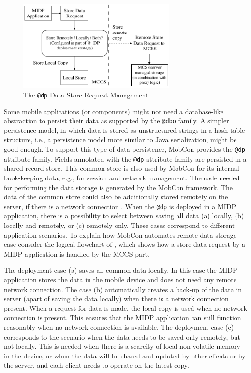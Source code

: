 \begin{figure}[ht]
	\begin{center}
		\includegraphics[width=8cm,height=!]{ch05/dpremote}
	\end{center}
	\caption{The \texttt{@dp} Data Store Request Management}
	\label{fig:mc.dp-remote}
\end{figure}

Some mobile applications (or components) might not need a database-like abstraction to persist their data as supported by the \texttt{@dbo} family. A simpler persistence model, in which data is stored as unstructured strings in a hash table structure, i.e., a persistence model more similar to Java serialization, might be good enough. 
%
To support this type of data persistence, MobCon provides the \texttt{@dp} attribute family. Fields annotated with the \texttt{@dp} attribute family are persisted in a shared record store. This common store is also used by MobCon for its internal book-keeping data, e.g., for session and network management. The code needed for performing the data storage is generated by the MobCon framework. 
%
The data of the common store could also be additionally stored remotely on the server, if there is a network connection . When the \texttt{@dp} is deployed in a MIDP application, there is a possibility to select between saving all data (a) locally, (b) locally and remotely, or (c) remotely only. These cases correspond to different application scenarios. To explain how MobCon automates remote data storage case consider the logical flowchart of , which shows how a store data request by a MIDP application is handled by the MCCS part.
 
The deployment case (a) saves all common data locally. In this case the MIDP application stores the data in the mobile device and does not need any remote network connection. The case (b) automatically creates a back-up of the data in server (apart of saving the data locally) when there is a network connection present. When a request for data is made, the local copy is used when no network connection is present. This ensures that the MIDP application can still function reasonably when no network connection is available. The deployment case (c) corresponds to the scenario when the data needs to be saved only remotely, but not locally. This is needed when there is a scarcity of local non-volatile memory in the device, or when the data will be shared and updated by other clients or by the server, and each client needs to operate on the latest copy.

